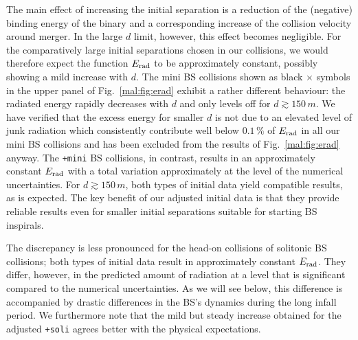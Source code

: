 The main effect of increasing the initial separation is a
reduction of the (negative) binding energy of the binary and a corresponding
increase of the collision velocity around merger. In the large
$d$ limit, however, this effect becomes negligible. For the
comparatively large initial separations chosen in our
collisions, we would therefore
expect the function $E_{\rm rad}$ to be approximately constant,
possibly showing a mild increase with $d$. The mini BS collisions
shown as black $\times$ symbols in the upper panel of
Fig.~\ref{mal:fig:erad} exhibit a rather different behaviour:
the radiated energy rapidly decreases with $d$ and only levels
off for $d\gtrsim 150\,m$. We have verified that the excess
energy for smaller $d$ is not due to an elevated level of
junk radiation which consistently contribute well below 
$0.1\,\%$ of $E_{\rm rad}$ in all our mini BS collisions and has
been excluded from the results of Fig.~\ref{mal:fig:erad} anyway.
The {\tt +mini} BS collisions,
in contrast, results in an approximately constant $E_{\rm rad}$
with a total variation approximately at the level of the
numerical uncertainties. For $d\gtrsim 150\,m$, both types of
initial data yield compatible results, as is expected.
The key benefit of our adjusted initial data is that they provide
reliable results even for smaller initial separations suitable
for starting BS inspirals.

The discrepancy is less pronounced for the head-on collisions
of solitonic BS collisions; both types of initial data result
in approximately constant $E_{\rm rad}$. They differ, however,
in the predicted amount of radiation at a level that
is significant compared to
the numerical uncertainties. As we will see below, this difference
is accompanied by drastic differences in the BS's dynamics during the
long infall period. We furthermore note that the mild but
steady increase obtained for the adjusted {\tt +soli} agrees
better with the physical expectations.

